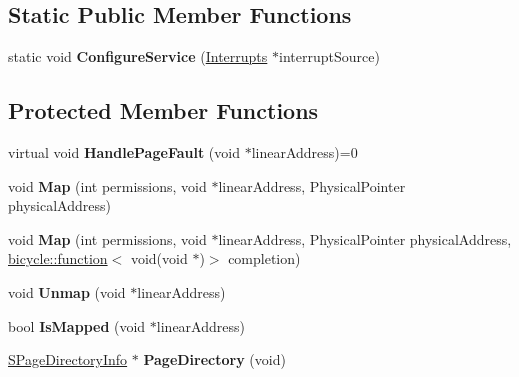 \subsection*{Static Public Member Functions}
\begin{DoxyCompactItemize}
\item 
\mbox{\label{class_virtual_memory_a568d1bc9af900305b3a5cdec77c3cae1}} 
static void {\bfseries Configure\+Service} (\hyperlink{class_interrupts}{Interrupts} $\ast$interrupt\+Source)
\end{DoxyCompactItemize}
\subsection*{Protected Member Functions}
\begin{DoxyCompactItemize}
\item 
\mbox{\label{class_virtual_memory_a51e9f6812e577590c4e475e0561ae4f3}} 
virtual void {\bfseries Handle\+Page\+Fault} (void $\ast$linear\+Address)=0
\item 
\mbox{\label{class_virtual_memory_af405215e3ff53f9aafa25377e6e3331a}} 
void {\bfseries Map} (int permissions, void $\ast$linear\+Address, Physical\+Pointer physical\+Address)
\item 
\mbox{\label{class_virtual_memory_a1e97b27cd6a6111edb400336612fab01}} 
void {\bfseries Map} (int permissions, void $\ast$linear\+Address, Physical\+Pointer physical\+Address, \hyperlink{classbicycle_1_1function}{bicycle\+::function}$<$ void(void $\ast$)$>$ completion)
\item 
\mbox{\label{class_virtual_memory_a6d4a619bf0dc08bb808c625a7bb907f5}} 
void {\bfseries Unmap} (void $\ast$linear\+Address)
\item 
\mbox{\label{class_virtual_memory_ae64bcb254e9f862788da5f3367e6b29a}} 
bool {\bfseries Is\+Mapped} (void $\ast$linear\+Address)
\item 
\mbox{\label{class_virtual_memory_a6b7538c8f3b74c1e8b796bf817976613}} 
\hyperlink{class_s_page_directory_info}{S\+Page\+Directory\+Info} $\ast$ {\bfseries Page\+Directory} (void)
\end{DoxyCompactItemize}
